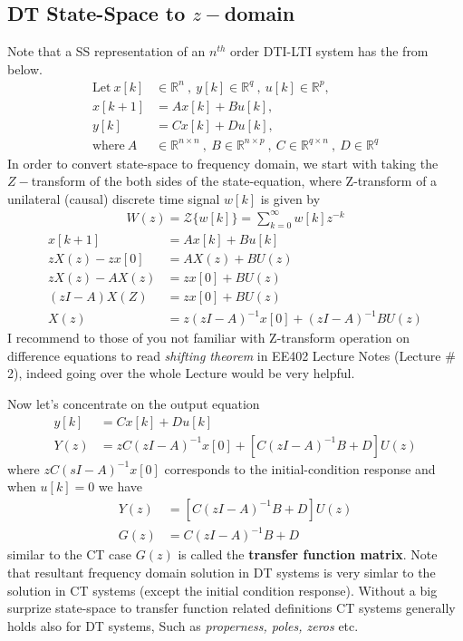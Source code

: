 \documentclass[twoside]{article}
\begin{document}
\subsection{DT State-Space to $z-$domain}

Note that a SS representation of an $n^{th}$ order DTI-LTI system has the from below.
%
\begin{align*}
  \mathrm{Let} \ x[k] &\in \mathbb{R}^n \ , \ y[k] \in \mathbb{R}^q \ ,\  u[k] \in
  \mathbb{R}^p , \\
  x[k+1] &= A x[k] + B u[k] , \\
  y[k] &= C x[k] + D u[k] , \\
  \mathrm{where} \ A &\in \mathbb{R}^{n \times n} \ , \ 
    B \in \mathbb{R}^{n \times p} \ ,\  C \in \mathbb{R}^{q \times n} \ , \ D \in \mathbb{R}^q
\end{align*}
%
In order to convert state-space to frequency domain, we start with taking the $Z-$transform of the 
both sides of the state-equation, where Z-transform of a unilateral (causal) discrete time signal $w[k]$ is given by 
%
\begin{align*}
  W(z) = \mathcal{Z} \lbrace w[k] \rbrace = \sum\limits_{k=0}^{\infty} w[k] z^{-k} 
\end{align*}
%
\begin{align*}
x[k+1] &= A x[k] + B u[k]
\\
z X(z) - z x[0] &= A X(z) + B U(z)
\\
z X(z) - A X(z) &= z x[0] +  B U(z)
\\
\left( z I - A \right) X(Z) &=  z x[0] +  B U(z)
\\
X(z) &= z \left( z I - A \right)^{-1} x[0] + \left( z I - A \right)^{-1} B U(z)
\end{align*}
%
I recommend to those of you not familiar with Z-transform operation on
difference equations to read \textit{shifting theorem} in EE402 Lecture Notes (Lecture
\# 2), indeed going over the whole Lecture would be very helpful. 

Now let's concentrate on the output equation
%
\begin{align*}
y[k] &= C x[k] + D u[k]
\\
Y(z) &= z C  \left( z I - A \right)^{-1} x[0] + \left[ C \left( z I - A \right)^{-1} B + D \right] U(z)
\end{align*}
%
where $z C  \left( s I - A \right)^{-1} x[0]$ corresponds to the initial-condition response and 
when $u[k]=0$ we have
%
\begin{align*}
Y(z) &=  \left[ C \left( z I - A \right)^{-1} B + D \right] U(z)
\\
G(z) &= C \left( z I - A \right)^{-1} B + D
\end{align*}
%
similar to the CT case $G(z)$ is called the \textbf{transfer function
  matrix}. Note that resultant frequency domain solution in DT systems
is very simlar to the solution in CT systems (except the initial
condition response). Without a big surprize state-space to transfer function related
definitions CT systems generally holds also for DT systems, Such as \textit{properness, poles,
  zeros} etc.



\end{document}
